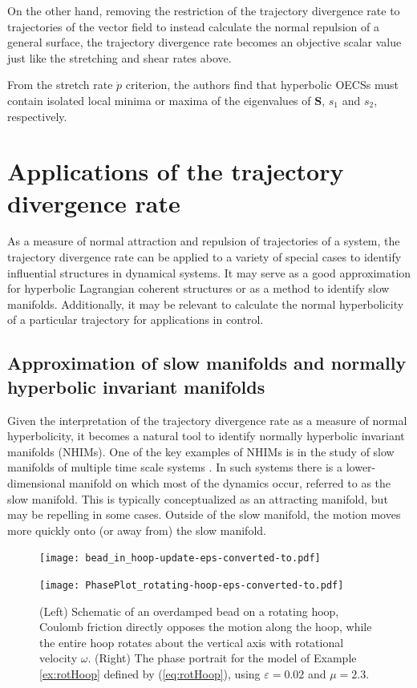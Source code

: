 \documentclass[twocolumn]{svjour3}
\begin{document}
On the other hand, removing the restriction of the trajectory divergence rate to trajectories of the vector field to instead calculate the normal repulsion of a general surface, the trajectory divergence rate becomes an objective scalar value just like the stretching and shear rates above.

From the stretch rate $\dot{p}$ criterion, the authors find that hyperbolic OECSs must contain isolated local minima or maxima of the eigenvalues of $\mathbf{S}$, $s_1$ and $s_2$, respectively.

\section{Applications of the trajectory divergence rate}\label{s:Application}
As a measure of normal attraction and repulsion of trajectories of a system, the trajectory divergence rate can be applied to a variety of special cases to identify influential structures in dynamical systems. It may serve as a good approximation for hyperbolic Lagrangian coherent structures or as a method to identify slow manifolds. Additionally, it may be relevant to calculate the normal hyperbolicity of a particular trajectory for applications in control.


\subsection{Approximation of slow manifolds and normally hyperbolic invariant manifolds}
Given the interpretation of the trajectory divergence rate as a measure of normal hyperbolicity, it becomes a natural tool to identify normally hyperbolic invariant manifolds (NHIMs). One of the key examples of NHIMs is in the study of slow manifolds of multiple time scale systems \cite{kuehn2016multiple}. In such systems there is a lower-dimensional manifold on which most of the dynamics occur, referred to as the slow manifold. This is typically conceptualized as an attracting manifold, but may be repelling in some cases. Outside of the slow manifold, the motion moves more quickly onto (or away from) the slow manifold. %

\begin{figure}
\begin{minipage}{3.2in}
\centering
\texttt{[image: bead\_in\_hoop-update-eps-converted-to.pdf]}
\end{minipage}
\begin{minipage}{3.2in}
\centering
\texttt{[image: PhasePlot\_rotating-hoop-eps-converted-to.pdf]}
\end{minipage}
\caption{\label{fig:rotHoopA} (Left) Schematic of an overdamped bead on a rotating hoop, Coulomb friction directly opposes the motion along the hoop, while the entire hoop rotates about the vertical axis with rotational velocity $\omega$. (Right) The phase portrait for the model of Example \ref{ex:rotHoop} defined by (\ref{eq:rotHoop}), using $\varepsilon = 0.02$ and $\mu = 2.3$.}
\end{figure}
\end{document}
